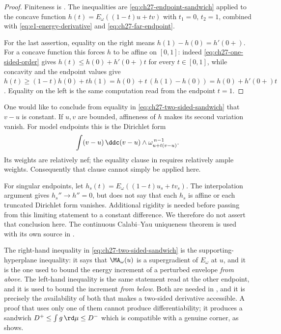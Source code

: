 \begin{proof}
Finiteness is .  The inequalities are
\eqref{eq:ch27-endpoint-sandwich} applied to the concave function
$h(t)=E_\omega((1-t)u+tv)$ with $t_1=0$, $t_2=1$, combined with
\eqref{eq:e1-energy-derivative} and \eqref{eq:ch27-far-endpoint}.

For the last assertion, equality on the right means
$h(1)-h(0)=h'(0+)$.  For a concave function this forces $h$ to be
affine on $[0,1]$: indeed \eqref{eq:ch27-one-sided-order} gives
$h(t)\leq h(0)+h'(0+)t$ for every $t\in[0,1]$, while concavity and the
endpoint values give
$h(t)\geq(1-t)h(0)+th(1)=h(0)+t\,(h(1)-h(0))=h(0)+h'(0+)t$.  Equality on
the left is the same computation read from the endpoint $t=1$.
\end{proof}

\begin{remark}
\label{rem:ch27-equality-case}
One would like to conclude from equality in
\eqref{eq:ch27-two-sided-sandwich} that $v-u$ is constant.  If $u,v$
are bounded, affineness of $h$ makes its second variation vanish.  For
model endpoints this is the Dirichlet form
\[
 \int(v-u)\,\ddc(v-u)\wedge
             \omega_{u+t(v-u)}^{\,n-1}.
\]
Its weights are relatively nef; the equality clause in
 requires relatively ample weights.
Consequently that clause cannot simply be applied here.

For singular endpoints, let $h_s(t)=E_\omega((1-t)u_s+tv_s)$.
The interpolation argument gives $h_s''\to h''=0$, but does not say that
each $h_s$ is affine or each truncated Dirichlet form vanishes.
Additional rigidity is needed before passing from this limiting statement
to a constant difference.  We therefore do not assert that conclusion
here.  The continuous Calabi--Yau uniqueness theorem is used with its own
source in .
\end{remark}

\begin{remark}
\label{rem:ch27-which-inequality}
The right-hand inequality in \eqref{eq:ch27-two-sided-sandwich} is the
supporting-hyperplane inequality: it says that
$\MA_\omega(u)$ is a supergradient of $E_\omega$ at $u$, and it is the
one used to bound the energy increment of a perturbed envelope
\emph{from above}.  The left-hand inequality is the same statement read at
the other endpoint, and it is used to bound the increment \emph{from below}.
Both are needed in , and it
is precisely the availability of both that makes a two-sided derivative
accessible.  A proof that uses only one of them cannot produce
differentiability; it produces a sandwich
$D^+\leq\int g\,\rd\mu\leq D^-$ which is compatible with a genuine corner,
as  shows.
\end{remark}

